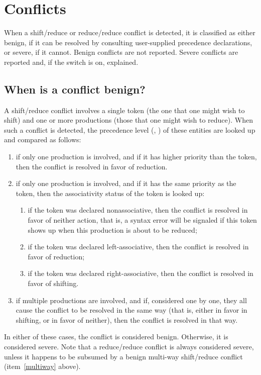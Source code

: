 \documentclass[onecolumn,11pt,nocopyrightspace,preprint]{sigplanconf}
\begin{document}


\section{Conflicts}
\label{sec:conflicts}

When a shift/reduce or reduce/reduce conflict is detected, it is classified as
either benign, if it can be resolved by consulting user-supplied precedence
declarations, or severe, if it cannot. Benign conflicts are not reported.
Severe conflicts are reported and, if the \oexplain switch is on, explained.

\subsection{When is a conflict benign?}
\label{sec:conflicts:benign}

A shift/reduce conflict involves a single token (the one that one might wish
to shift) and one or more productions (those that one might wish to
reduce). When such a conflict is detected, the precedence level
(, ) of these entities are looked up and
compared as follows:
\begin{enumerate}
\item if only one production is involved, and if it has higher priority
      than the token, then the conflict is resolved in favor of reduction.
\item if only one production is involved, and if it has the same priority
      as the token, then the associativity status of the token is looked up:
      \begin{enumerate}
      \item if the token was declared nonassociative, then the conflict is
            resolved in favor of neither action, that is, a syntax error
	    will be signaled if this token shows up when this production
	    is about to be reduced;
      \item if the token was declared left-associative, then the conflict
            is resolved in favor of reduction;
      \item if the token was declared right-associative, then the conflict
            is resolved in favor of shifting.
      \end{enumerate}
\item \label{multiway}
      if multiple productions are involved, and if, considered one by one,
      they all cause the conflict to be resolved in the same way (that is,
      either in favor in shifting, or in favor of neither), then the conflict
      is resolved in that way.
\end{enumerate}
In either of these cases, the conflict is considered benign. Otherwise, it is
considered severe. Note that a reduce/reduce conflict is always considered
severe, unless it happens to be subsumed by a benign multi-way shift/reduce
conflict (item~\ref{multiway} above).
\end{document}
